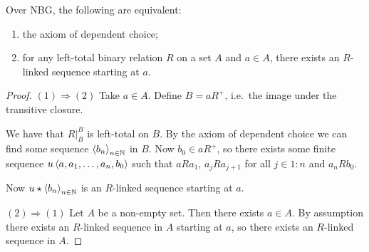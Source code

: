 \begin{lemma} \label{freedomFirstElementChoiceSequence}
Over NBG, the following are equivalent:
\begin{enumerate}
\item the axiom of dependent choice;
\item for any left-total binary relation $R$ on a set $A$ and $a\in A$, there exists an $R$-linked sequence starting at $a$.
\end{enumerate}
\end{lemma}
\begin{proof}
$\boxed{(1)\Rightarrow (2)}$ Take $a\in A$. Define $B = aR^+$, i.e.\ the image under the transitive closure.

We have that $R|^B_B$ is left-total on $B$. By the axiom of dependent choice we can find some sequence $\left\langle b_n \right\rangle_{n\in \mathbb{N}}$ in $B$. Now $b_0\in aR^+$, so there exists some finite sequence $u\left\langle a, a_1, \ldots, a_n, b_0 \right\rangle$ such that $aRa_1$,  $a_{j}Ra_{j+1}$ for all $j\in 1:n$ and $a_nRb_0$.

Now $u\star \left\langle b_n \right\rangle_{n\in \mathbb{N}}$ is an $R$-linked sequence starting at $a$.

$\boxed{(2)\Rightarrow (1)}$ Let $A$ be a non-empty set. Then there exists $a\in A$. By assumption there exists an $R$-linked sequence in $A$ starting at $a$, so there exists an $R$-linked sequence in $A$.
\end{proof}

